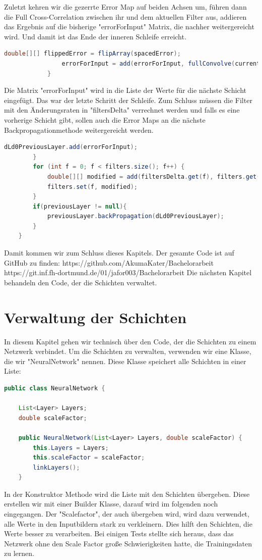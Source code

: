 \documentclass[12pt]{article}
\begin{document}
Zuletzt kehren wir die gezerrte Error Map auf beiden Achsen um, führen dann die Full Cross-Correlation zwischen ihr und dem aktuellen Filter aus, addieren das Ergebnis auf die bisherige "errorForInput" Matrix, die nachher weitergereicht wird. Und damit ist das Ende der inneren Schleife erreicht.
\begin{lstlisting}[language=Java]
                double[][] flippedError = flipArray(spacedError);
                errorForInput = add(errorForInput, fullConvolve(currentFilter, flippedError));
            }
\end{lstlisting}
Die Matrix "errorForInput" wird in die Liste der Werte für die nächste Schicht eingefügt. Das war der letzte Schritt der Schleife. Zum Schluss müssen die Filter mit den Änderungsraten in "filtersDelta" verrechnet werden und falls es eine vorherige Schicht gibt, sollen auch die Error Maps an die nächste Backpropagationmethode weitergereicht werden.
\begin{lstlisting}[language=Java]
            dLd0PreviousLayer.add(errorForInput);
        }
        for (int f = 0; f < filters.size(); f++) {
            double[][] modified = add(filtersDelta.get(f), filters.get(f));
            filters.set(f, modified);
        }
        if(previousLayer != null){
            previousLayer.backPropagation(dLd0PreviousLayer);
        }
    }
\end{lstlisting}

Damit kommen wir zum Schluss dieses Kapitels. Der gesamte Code ist auf GitHub zu finden:
https://github.com/AkumaKater/Bachelorarbeit
https://git.inf.fh-dortmund.de/01/jafor003/Bachelorarbeit
Die nächsten Kapitel behandeln den Code, der die Schichten verwaltet. 

\cleardoublepage
\section{Verwaltung der Schichten}
In diesem Kapitel gehen wir technisch über den Code, der die Schichten zu einem Netzwerk verbindet.
Um die Schichten zu verwalten, verwenden wir eine Klasse, die wir "NeuralNetwork" nennen. Diese Klasse speichert alle Schichten in einer Liste:

\begin{lstlisting}[language=Java]
public class NeuralNetwork {

    List<Layer> Layers;
    double scaleFactor;

    public NeuralNetwork(List<Layer> Layers, double scaleFactor) {
        this.Layers = Layers;
        this.scaleFactor = scaleFactor;
        linkLayers();
    }
\end{lstlisting}
In der Konstruktor Methode wird die Liste mit den Schichten übergeben. Diese erstellen wir mit einer Builder Klasse, darauf wird im folgenden noch eingegangen. Der "Scalefactor", der auch übergeben wird, wird dazu verwendet, alle Werte in den Inputbildern stark zu verkleinern. Dies hilft den Schichten, die Werte besser zu verarbeiten.
Bei einigen Tests stellte sich heraus, dass das Netzwerk ohne den Scale Factor große Schwierigkeiten hatte, die Trainingsdaten zu lernen.
\end{document}
